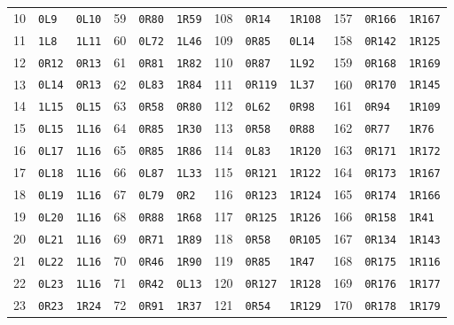 \begin{center}
\begin{tabular}{rll@{\hspace{12pt}}rll@{\hspace{12pt}}rll@{\hspace{12pt}}rll}
10 & \texttt{0L9} & \texttt{0L10} & 59 & \texttt{0R80} & \texttt{1R59} & 108 & \texttt{0R14} & \texttt{1R108} & 157 & \texttt{0R166} & \texttt{1R167}\\
11 & \texttt{1L8} & \texttt{1L11} & 60 & \texttt{0L72} & \texttt{1L46} & 109 & \texttt{0R85} & \texttt{0L14} & 158 & \texttt{0R142} & \texttt{1R125}\\
12 & \texttt{0R12} & \texttt{0R13} & 61 & \texttt{0R81} & \texttt{1R82} & 110 & \texttt{0R87} & \texttt{1L92} & 159 & \texttt{0R168} & \texttt{1R169}\\
13 & \texttt{0L14} & \texttt{0R13} & 62 & \texttt{0L83} & \texttt{1R84} & 111 & \texttt{0R119} & \texttt{1L37} & 160 & \texttt{0R170} & \texttt{1R145}\\
14 & \texttt{1L15} & \texttt{0L15} & 63 & \texttt{0R58} & \texttt{0R80} & 112 & \texttt{0L62} & \texttt{0R98} & 161 & \texttt{0R94} & \texttt{1R109}\\
15 & \texttt{0L15} & \texttt{1L16} & 64 & \texttt{0R85} & \texttt{1R30} & 113 & \texttt{0R58} & \texttt{0R88} & 162 & \texttt{0R77} & \texttt{1R76}\\
16 & \texttt{0L17} & \texttt{1L16} & 65 & \texttt{0R85} & \texttt{1R86} & 114 & \texttt{0L83} & \texttt{1R120} & 163 & \texttt{0R171} & \texttt{1R172}\\
17 & \texttt{0L18} & \texttt{1L16} & 66 & \texttt{0L87} & \texttt{1L33} & 115 & \texttt{0R121} & \texttt{1R122} & 164 & \texttt{0R173} & \texttt{1R167}\\
18 & \texttt{0L19} & \texttt{1L16} & 67 & \texttt{0L79} & \texttt{0R2} & 116 & \texttt{0R123} & \texttt{1R124} & 165 & \texttt{0R174} & \texttt{1R166}\\
19 & \texttt{0L20} & \texttt{1L16} & 68 & \texttt{0R88} & \texttt{1R68} & 117 & \texttt{0R125} & \texttt{1R126} & 166 & \texttt{0R158} & \texttt{1R41}\\
20 & \texttt{0L21} & \texttt{1L16} & 69 & \texttt{0R71} & \texttt{1R89} & 118 & \texttt{0R58} & \texttt{0R105} & 167 & \texttt{0R134} & \texttt{1R143}\\
21 & \texttt{0L22} & \texttt{1L16} & 70 & \texttt{0R46} & \texttt{1R90} & 119 & \texttt{0R85} & \texttt{1R47} & 168 & \texttt{0R175} & \texttt{1R116}\\
22 & \texttt{0L23} & \texttt{1L16} & 71 & \texttt{0R42} & \texttt{0L13} & 120 & \texttt{0R127} & \texttt{1R128} & 169 & \texttt{0R176} & \texttt{1R177}\\
23 & \texttt{0R23} & \texttt{1R24} & 72 & \texttt{0R91} & \texttt{1R37} & 121 & \texttt{0R54} & \texttt{1R129} & 170 & \texttt{0R178} & \texttt{1R179}\\

\end{tabular}
\end{center}

